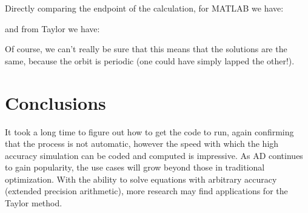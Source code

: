 \documentclass[11pt]{article}
\begin{document}
Directly comparing the endpoint of the calculation, for MATLAB we have:

and from Taylor we have:


Of course, we can't really be sure that this means that the solutions are the same, because the orbit is periodic (one could have simply lapped the other!).

\pagebreak
\section{Conclusions}

It took a long time to figure out how to get the code to run, again confirming that the process is not automatic, however the speed with which the high accuracy simulation can be coded and computed is impressive.
As AD continues to gain popularity, the use cases will grow beyond those in traditional optimization.
With the ability to solve equations with arbitrary accuracy (extended precision arithmetic), more research may find applications for the Taylor method.




\pagebreak
\nocite{bischof2000computing}
\nocite{gay2006semiautomatic}
\nocite{griewank2003mathematical}
\nocite{pryce2008fast}
\nocite{barrio2005performance}
\nocite{jorba2005software}
\nocite{verma2000introduction}
\nocite{walther2012getting}



\end{document}
